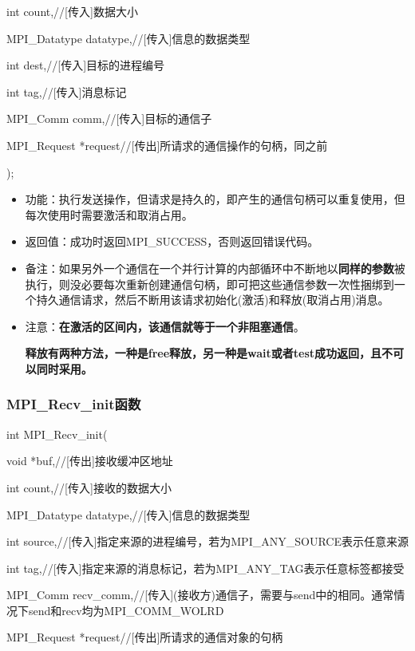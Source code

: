 \documentclass[UTF8]{article}%
\begin{document}
    \qquad int          count,//[传入]数据大小

    \qquad MPI\_Datatype datatype,//[传入]信息的数据类型

    \qquad int          dest,//[传入]目标的进程编号

    \qquad int          tag,//[传入]消息标记

    \qquad MPI\_Comm     comm,//[传入]目标的通信子

    \qquad MPI\_Request  *request//[传出]所请求的通信操作的句柄，同之前

);

\begin{itemize}
    \item 功能：执行发送操作，但请求是持久的，即产生的通信句柄可以重复使用，但每次使用时需要激活和取消占用。
    \item 返回值：成功时返回MPI\_SUCCESS，否则返回错误代码。
    \item 备注：如果另外一个通信在一个并行计算的内部循环中不断地以\textbf{同样的参数}被执行，则没必要每次重新创建通信句柄，即可把这些通信参数一次性捆绑到一个持久通信请求，然后不断用该请求初始化(激活)和释放(取消占用)消息。
    \item 注意：\textbf{在激活的区间内，该通信就等于一个非阻塞通信}。
    
    \textbf{释放有两种方法，一种是free释放，另一种是wait或者test成功返回，且不可以同时采用。}
\end{itemize}

\subsubsection{MPI\_Recv\_init函数}

int MPI\_Recv\_init(

    \qquad void            *buf,//[传出]接收缓冲区地址

    \qquad int             count,//[传入]接收的数据大小

    \qquad MPI\_Datatype   datatype,//[传入]信息的数据类型

    \qquad int             source,//[传入]指定来源的进程编号，若为MPI\_ANY\_SOURCE表示任意来源

    \qquad int             tag,//[传入]指定来源的消息标记，若为MPI\_ANY\_TAG表示任意标签都接受

    \qquad MPI\_Comm       recv\_comm,//[传入](接收方)通信子，需要与send中的相同。通常情况下send和recv均为MPI\_COMM\_WOLRD

    \qquad MPI\_Request  *request//[传出]所请求的通信对象的句柄
\end{document}
